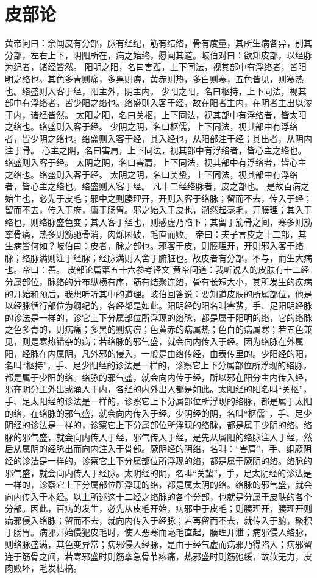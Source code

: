 \documentclass[a4paper,12pt,UTF8,twoside]{ctexbook}
\begin{document}
\chapter{皮部论}
黄帝问曰：余闻皮有分部，脉有经纪，筋有结络，骨有度量，其所生病各异，别其分部，左右上下，阴阳所在，病之始终，愿闻其道。岐伯对曰：欲知皮部，以经脉为纪者，诸经皆然。
阳明之阳，名曰害蜚，上下同法，视其部中有浮络者，皆阳明之络也。其色多青则痛，多黑则痹，黄赤则热，多白则寒，五色皆见，则寒热也。络盛则入客于经，阳主外，阴主内。
少阳之阳，名曰枢持，上下同法，视其部中有浮络者，皆少阳之络也。络盛则入客于经，故在阳者主内，在阴者主出以渗于内，诸经皆然。
太阳之阳，名曰关枢，上下同法，视其部中有浮络者，皆太阳之络也。络盛则入客于经。
少阴之阴，名曰枢儒，上下同法，视其部中有浮络者，皆少阴之络也。络盛则入客于经，其入经也，从阳部注于经；其出者，从阴内注于骨。
心主之阴，名曰害肩，上下同法，视其部中有浮络者，皆心主之络也。络盛则入客于经。
太阴之阴，名曰害肩，上下同法，视其部中有浮络者，皆心主之络也。络盛则入客于经。
太阴之阴，名曰关蛰，上下同法，视其部中有浮络者，皆心主之络也。络盛则入客于经。
凡十二经络脉者，皮之部也。
是故百病之始生也，必先于皮毛；邪中之则腠理开，开则入客于络脉；留而不去，传入于经；留而不去，传入于府，廪于肠胃。邪之始入于皮也，溯然起毫毛，开腠理；其入于络也，则络脉盛色变；其入客于经也，则感虚乃陷下；其留于筋骨之间，寒多则筋挛骨痛，热多则筋驰骨消，肉烁囷破，毛直而败。
帝曰：夫子言皮之十二部，其生病皆何如？岐伯曰：皮者，脉之部也。邪客于皮，则腠理开，开则邪入客于络脉；络脉满则注于经脉；经脉满则入舍于腑脏也。故皮者有分部，不与，而生大病也。帝曰：善。
皮部论篇第五十六参考译文
黄帝问道：我听说人的皮肤有十二经分属部位，脉络的分布纵横有序，筋有结聚连络，骨有长短大小，其所发生的疾病的开始和预后，我想听听其中的道理。岐伯回答说：要知道皮肤的所属部位，他是以经脉循行部位为纲纪的，各经都是如此。阳明经的阳名叫害蜚，手、足阳明经脉的诊法是一样的，诊它上下分属部位所浮现的络脉，都是属于阳明的络，它的络脉之色多青的，则病痛；多黑的则病痹；色黄赤的病属热；色白的病属寒；若五色兼见，则是寒热错杂的病；若络脉的邪气盛，就会向内传入于经。因为络脉在外属阳，经脉在内属阴，凡外邪的侵入，一般是由络传经，由表传里的。少阳经的阳，名叫“枢持”，手、足少阳经的诊法是一样的，诊察它上下分属部位所浮现的络脉，都是属于少阳的络。络脉的邪气盛，就会向内传于经，所以邪在阳分主内传入经，邪在阴分主外出或涌入于内，各经的内外出入都是如此。太阳经的阳名叫“关枢”，手、足太阳经的诊法是一样的，诊察它上下分属部位所浮现的络脉，都是属于太阳的络，在络脉的邪气盛，就会向内传入于经。少阴经的阴，名叫“枢儒”，手、足少阴经的诊法是一样的，诊察它上下分属部位所浮现的络脉，都是属于少阴的络。络脉的邪气盛，就会向内传入于经，邪气传入于经，是先从属阳的络脉注入于经，然后从属阴的经脉出而向内注入于骨部。厥阴经的阴络，名叫：“害肩”，手、组厥阴经的诊法是一样的，诊察它上下分属部位所浮现的络，都是属于厥阴的络。络脉的邪气盛，就会向内传入于经脉。太阴经的阴，名叫“关蛰”，手，足太阴经的诊法是一样的，诊察它上下分属部位所浮现的络，都是属太阴的络。络脉的邪气盛，就会向内传入于本经。以上所述这十二经之络脉的各个分部，也就是分属于皮肤的各个分部。因此，百病的发生，必先从皮毛开始，病邪中于皮毛；则腠理开，腠理开则病邪侵入络脉；留而不去，就向内传入于经脉；若再留而不去，就传入于腑，聚积于肠胃。病邪开始侵犯皮毛时，使人恶寒而毫毛直起，腠理开泄；病邪侵入络脉，则络脉盛满，其色变异常；病邪侵入经脉，是由于经气虚而病邪乃得陷入；病邪留连于筋骨之间，若寒邪盛时则筋挛急骨节疼痛，热邪盛时则筋弛缓，故软无力，皮肉败坏，毛发枯槁。
\end{document}
